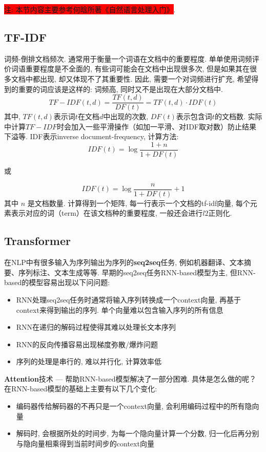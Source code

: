 \colorbox{red}{注: 本节内容主要参考何晗所著《自然语言处理入门》}. 

\subsection{TF-IDF}
词频-倒排文档频次. 通常用于衡量一个词语在文档中的重要程度. 单单使用词频评价词语重要程度是不全面的, 有些词可能会在文档中出现很多次, 但是如果其在很多文档中都出现, 却又体现不了其重要性. 因此, 需要一个对词频进行扩充, 希望得到的重要的词应该是这样的: 词频高, 同时又不是出现在大部分文档中. 
$$
TF-IDF(t, d) = \frac{TF(t, d)}{DF(t)} = TF(t, d) \cdot IDF(t)
$$
其中, $TF(t, d)$表示词$t$在文档$d$中出现的次数, $DF(t)$表示包含词$t$的文档数. 实际中计算$TF-IDF$时会加入一些平滑操作（如加一平滑、对IDF取对数）防止结果下溢等.  IDF表示inverse document-frequency, 计算方法: 
$$
IDF(t) = \log \frac{1 + n}{1 + DF(t)}
$$
\begin{center}
	或
\end{center}
$$
IDF(t) = \log \frac{n}{1 + DF(t)} + 1
$$
其中 $n$ 是文档数量. 计算得到一个矩阵, 每一行表示一个文档的tf-idf向量, 每个元素表示对应的词（term）在该文档种的重要程度, 一般还会进行$l2$正则化. 

\subsection{Transformer}
在NLP中有很多输入为序列输出为序列的\textbf{seq2seq}任务, 例如机器翻译、文本摘要、序列标注、文本生成等等. 早期的seq2seq任务RNN-based\cite{sutskever2014sequence, cho2014learning}模型为主, 但RNN-based的模型容易出现以下问问题: 
\begin{itemize}
	\item RNN处理seq2seq任务时通常将输入序列转换成一个context向量, 再基于context来得到输出的序列. 单个向量难以包含输入序列的所有信息
	\item RNN在递归的解码过程使得其难以处理长文本序列
	\item RNN的反向传播容易出现梯度弥散/爆炸问题
	\item 序列的处理是串行的, 难以并行化, 计算效率低
\end{itemize}
\textbf{Attention}\cite{bahdanau2016neural, luong2015effective}技术 --- 帮助RNN-based模型解决了一部分困难. 具体是怎么做的呢？在RNN-based模型的基础上主要有以下几个变化: 
\begin{itemize}
	\item 编码器传给解码器的不再只是一个context向量, 会利用编码过程中的所有隐向量
	\item 解码时, 会根据所处的时间步, 为每一个隐向量计算一个分数, 归一化后再分别与隐向量相乘得到当前时间步的context向量
\end{itemize}

